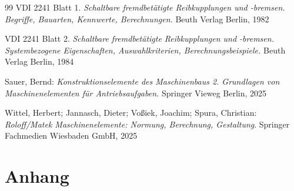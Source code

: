 \documentclass[11pt,a4paper,ngerman]{article}
\begin{document}


\setcounter{page}{3}
\tableofcontents
\newpage

{}
\listoffigures
\newpage

{}
\listoftables
\newpage











\newpage
{}
\begin{thebibliography}{99}
    VDI 2241 Blatt 1. \textit{Schaltbare fremdbetätigte Reibkupplungen und -bremsen. Begriffe, Bauarten, Kennwerte, Berechnungen.} Beuth Verlag Berlin, 1982

    VDI 2241 Blatt 2. \textit{Schaltbare fremdbetätigte Reibkupplungen und -bremsen. Systembezogene Eigenschaften, Auswahlkriterien, Berechnungsbeispiele.} Beuth Verlag Berlin, 1984

    Sauer, Bernd: \textit{Konstruktionselemente des Maschinenbaus 2. Grundlagen von Maschinenelementen für Antriebsaufgaben.} Springer Vieweg Berlin, 2025

    Wittel, Herbert; Jannasch, Dieter; Voßiek, Joachim; Spura, Christian: \textit{Roloff/Matek Maschinenelemente: Normung, Berechnung, Gestaltung}. Springer Fachmedien Wiesbaden GmbH, 2025

\end{thebibliography}
\newpage
{}
\section*{Anhang}

\end{document}
